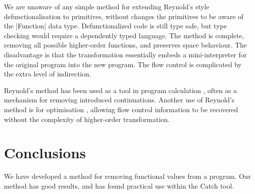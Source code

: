 \documentclass[preprint]{sigplanconf}
\begin{document}
We are unaware of any simple method for extending Reynold's style defunctionalisation to primitives, without changes the primitives to be aware of the |Function| data type. Defunctionalized code is still type safe, but type checking would require a dependently typed language. The method is complete, removing all possible higher-order functions, and preserves space behaviour. The disadvantage is that the transformation essentially embeds a mini-interpreter for the original program into the new program. The flow control is complicated by the extra level of indirection.

Reynold's method has been used as a tool in program calculation \cite{graham_hutton_calculating_an_exceptional_machine, another_one, another_one}, often as a mechanism for removing introduced continuations. Another use of Reynold's method is for optimisation \cite{grin,jhc}, allowing flow control information to be recovered without the complexity of higher-order transformation.



\section{Conclusions}

We have developed a method for removing functional values from a program. Our method has good results, and has found practical use within the Catch tool.






\end{document}
